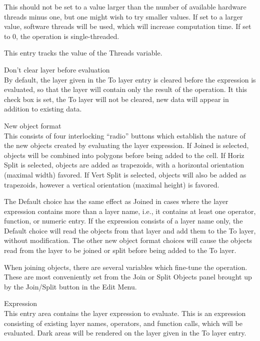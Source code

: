 \begin{description}
This should not be set to a value larger than the number of available
hardware threads minus one, but one might wish to try smaller values. 
If set to a larger value, software threads will be used, which will
increase computation time.  If set to 0, the operation is
single-threaded.

This entry tracks the value of the {\et Threads} variable.

\item{\cb Don't clear layer before evaluation}\\
By default, the layer given in the {\cb To layer} entry is cleared
before the expression is evaluated, so that the layer will contain
only the result of the operation.  It this check box is set, the {\cb
To layer} will not be cleared, new data will appear in addition to
existing data.

\item{\cb New object format}\\
This consists of four interlocking ``radio'' buttons which establish
the nature of the new objects created by evaluating the layer
expression.  If {\cb Joined} is selected, objects will be combined
into polygons before being added to the cell.  If {\cb Horiz Split} is
selected, objects are added as trapezoids, with a horizontal
orientation (maximal width) favored.  If {\cb Vert Split} is selected,
objects will also be added as trapezoids, however a vertical
orientation (maximal height) is favored.

The {\cb Default} choice has the same effect as {\cb Joined} in cases
where the layer expression contains more than a layer name, i.e., it
contains at least one operator, function, or numeric entry.  If the
expression consists of a layer name only, the {\cb Default} choice
will read the objects from that layer and add them to the {\cb To
layer}, without modification.  The other new object format choices
will cause the objects read from the layer to be joined or split
before being added to the {\cb To layer}.

When joining objects, there are several variables which fine-tune the
operation.  These are most conveniently set from the {\cb Join or
Split Objects} panel brought up by the {\cb Join/Split} button in the
{\cb Edit Menu}.

\item{\cb Expression}\\
This entry area contains the layer expression to evaluate.  This is an
expression consisting of existing layer names, operators, and function
calls, which will be evaluated.  Dark areas will be rendered on the
layer given in the {\cb To layer} entry.


\end{description}
